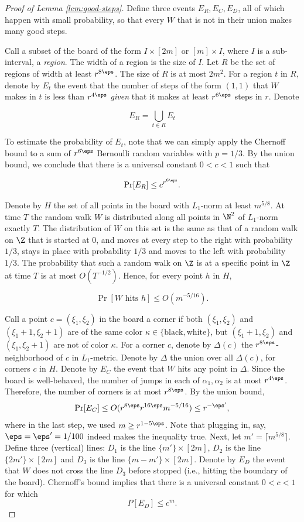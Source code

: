 \documentclass{article}
\begin{document}
\begin{proof}[Proof of Lemma \ref{lem:good-steps}]
    Define three events $E_R, E_C, E_D$, all of which happen with small probability, so that every $W$ that
is not in their union makes many good steps.

Call a subset of the board of the form $I \times [2m]$ or $[m] \times I$, where $I$ is a sub-interval, a \emph{region}.
The width of a region is the size of $I$. Let $R$ be the set of regions of width at least $r^{8\eps}$. The size
of $R$ is at most $2m^2$. For a region $t$ in $R$, denote by $E_t$ the event that the number of steps of the
form $(1, 1)$ that $W$ makes in $t$ is less than $r^{4\eps}$ \emph{given} that it makes at least $r^{6\eps}$ steps in $r$. Denote

\[
E_R = \bigcup_{t\in R} E_t
\]

To estimate the probability of $E_t$, note that we can simply apply the Chernoff bound to a sum of $r^{6\eps}$ Bernoulli random variables with $p = 1/3$. By the union bound, we conclude that there is a universal constant $0<c<1$ such that

\[
\Pr[E_R] \leq c^{r^{6\eps}}.
\]

Denote by $H$ the set of all points in the board with $L_1$-norm at least $m^{5/8}$. At time $T$ the
random walk $W$ is distributed along all points in $\N^2$ of $L_1$-norm exactly $T$. The distribution of
$W$ on this set is the same as that of a random walk on $\Z$ that is started at $0$, and moves at every
step to the right with probability $1/3$, stays in place with probability $1/3$ and moves to the left with probability $1/3$. The probability
that such a random walk on $\Z$ is at a specific point in $\Z$ at time $T$ is at most $O(T^{-1/2})$. Hence, for
every point $h$ in $H$,

\[
\Pr[W \text{ hits } h]\leq O(m^{-5/16}).
\]

Call a point $c = (\xi_1, \xi_2)$ in the board a corner if both $(\xi_1, \xi_2)$ and $(\xi_1 + 1, \xi_2 + 1)$ are of the same
color $\kappa \in \{\mathrm{black}, \mathrm{white}\}$, but $(\xi_1 + 1, \xi_2)$ and $(\xi_1, \xi_2 + 1)$ are not of color $\kappa$. For a corner $c$, denote
by $\Delta(c)$ the $r^{8\eps}$-neighborhood of $c$ in $L_1$-metric. Denote by $\Delta$ the union over all $\Delta(c)$, for corners
$c$ in $H$. Denote by $E_C$ the event that $W$ hits any point in $\Delta$. Since the board is well-behaved, the
number of jumps in each of $\alpha_1, \alpha_2$ is at most $r^{4\eps}$. Therefore, the number of corners is at most
$r^{8\eps}$. By the union bound,
\[
\Pr[E_C] \leq O(r^{8\eps}r^{16\eps}m^{-5/16}) \leq r^{-\eps'},
\]
where in the last step, we used $m \geq r^{1 - 5\eps}$. Note that plugging in, say, $\eps = \eps' = 1/100$ indeed makes the inequality true. Next, let $m' = \lceil m^{5/8}\rceil$. Define three (vertical) lines: $D_1$ is the line $\{m'\} \times [2m]$, $D_2$ is the line
$\{2m'\} \times [2m]$ and $D_3$ is the line $\{m - m'\} \times [2m]$. Denote by $E_D$ the event that $W$ does not cross
the line $D_3$ before stopped (i.e., hitting the boundary of the board). Chernoff’s bound implies that there is a universal constant $0<c<1$ for which
\[
P[E_D] \leq c^m.
\]


\end{proof}
\end{document}
